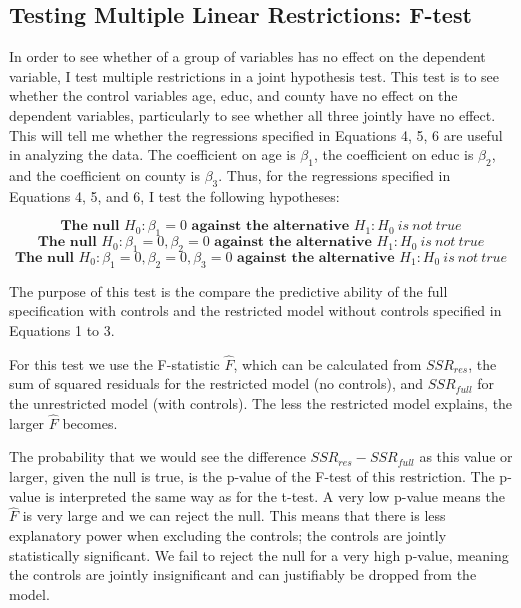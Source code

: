 \documentclass[a4paper]{article}
\begin{document}
\subsection{Testing Multiple Linear Restrictions: F-test}

In order to see whether of a group of variables has no effect on the dependent variable, I test multiple restrictions in a joint hypothesis test. This test is to see whether the control variables age, educ, and county have no effect on the dependent variables, particularly to see whether all three jointly have no effect. This will tell me whether the regressions specified in Equations 4, 5, 6 are useful in analyzing the data. The coefficient on age is $\beta_1$, the coefficient on educ is $\beta_2$, and the coefficient on county is $\beta_3$. Thus, for the regressions specified in Equations 4, 5, and 6, I test the following hypotheses:

\begin{equation}
\textbf{The null $H_0: \beta_1 = 0$ against the alternative \(H_1: H_0\:is \:not\: true\)}
\end{equation}
\begin{equation}
\textbf{The null $H_0: \beta_1 = 0, \beta_2 = 0$ against the alternative \(H_1: H_0\:is \:not\: true\)}
\end{equation}
\begin{equation}
\textbf{The null $H_0: \beta_1 = 0, \beta_2 = 0, \beta_3 = 0$ against the alternative \(H_1: H_0\:is \:not\: true\)}
\end{equation}

The purpose of this test is the compare the predictive ability of the full specification with controls and the restricted model without controls specified in Equations 1 to 3. 

For this test we use the F-statistic $\hat{F}$, which can be calculated from $SSR_{res}$, the sum of squared residuals for the restricted model (no controls), and $SSR_{full}$ for the unrestricted model (with controls). The less the restricted model explains, the larger $\hat{F}$ becomes. 

The probability that we would see the difference $SSR_{res} - SSR_{full}$ as this value or larger, given the null is true, is the p-value of the F-test of this restriction. The p-value is interpreted the same way as for the t-test. A very low p-value means the $\hat{F}$ is very large and we can reject the null. This means that there is less explanatory power when excluding the controls; the controls are jointly statistically significant. We fail to reject the null for a very high p-value, meaning the controls are jointly insignificant and can justifiably be dropped from the model.
\end{document}
